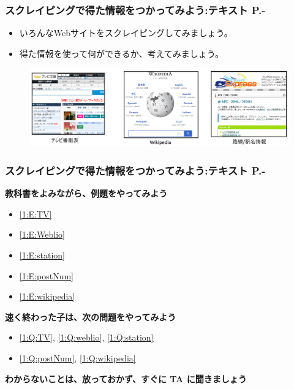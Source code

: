 \documentclass[dvipdfmx]{beamer}
\begin{document}
\begin{frame}[fragile]
	\frametitle{\large{スクレイピングで得た情報をつかってみよう:テキスト P.\pageref{1:P:scraping}-}~~~}
    \begin{itemize}
        \item いろんなWebサイトをスクレイピングしてみましょう。
        \item 得た情報を使って何ができるか、考えてみましょう。
    \end{itemize}
    \begin{figure}
      \centering
      \includegraphics[width=\textwidth]{slide08-img007.png}
    \end{figure}
\end{frame}

\begin{frame}[fragile]
	\frametitle{\large{スクレイピングで得た情報をつかってみよう:テキスト P.\pageref{1:P:scraping}-}~~~}
      \large\textbf{教科書をよみながら、例題をやってみよう}
				\begin{itemize}
					\item \ref*{1:E:TV}
					\item \ref*{1:E:Weblio}
					\item \ref*{1:E:station}
					\item \ref*{1:E:postNum}
					\item \ref*{1:E:wikipedia}
				\end{itemize}
      \vfill
      \large\textbf{速く終わった子は、次の問題をやってみよう}
				\begin{itemize}
					\item \ref*{1:Q:TV}, \ref*{1:Q:weblio}, \ref*{1:Q:station}
					\item \ref*{1:Q:postNum}, \ref*{1:Q:wikipedia}
				\end{itemize}
      \vfill
      \large\textbf{わからないことは、放っておかず、すぐに TA に聞きましょう}
\end{frame}
\end{document}
